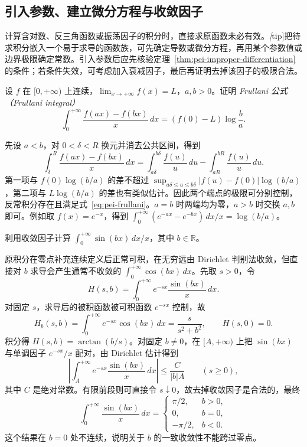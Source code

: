 \subsection{引入参数、建立微分方程与收敛因子}

计算含对数、反三角函数或振荡因子的积分时，直接求原函数未必有效。\emph[tip]{把待求积分嵌入一个易于求导的函数族}，可先确定导数或微分方程，再用某个参数值或边界极限确定常数。引入参数后应先核验定理~\ref{thm:pei-improper-differentiation} 的条件；若条件失效，可考虑加入衰减因子，最后再证明去掉该因子的极限合法。

\begin{example}
\label{ex:pei-frullani}
设 $f$ 在 $[0,+\infty)$ 上连续，$\lim_{x\to+\infty}f(x)=L$，$a,b>0$。证明 \emph{Frullani 公式（Frullani integral）}
\begin{equation}
\label{eq:pei-frullani}
\int_0^{+\infty}\frac{f(ax)-f(bx)}x\,dx
=(f(0)-L)\log\frac ba.
\end{equation}
\end{example}
\begin{solve}
先设 $a<b$，对 $0<\delta<R$ 换元并消去公共区间，得到
\[
\int_\delta^R\frac{f(ax)-f(bx)}x\,dx
=\int_{a\delta}^{b\delta}\frac{f(u)}u\,du
-\int_{aR}^{bR}\frac{f(u)}u\,du.
\]
第一项与 $f(0)\log(b/a)$ 的差不超过
$\sup_{a\delta\le u\le b\delta}|f(u)-f(0)|\log(b/a)$，第二项与 $L\log(b/a)$ 的差也有类似估计。因此两个端点的极限可分别控制，反常积分存在且满足式~\eqref{eq:pei-frullani}。$a=b$ 时两端均为零，$a>b$ 时交换 $a,b$ 即可。例如取 $f(x)=e^{-x}$，得到 $\int_0^{+\infty}(e^{-ax}-e^{-bx})\,dx/x=\log(b/a)$。
\end{solve}

\begin{example}
\label{ex:pei-dirichlet-integral}
利用收敛因子计算 $\int_0^{+\infty}\sin(bx)\,dx/x$，其中 $b\in\mathbb R$。
\end{example}
\begin{solve}
原积分在零点补充连续定义后正常可积，在无穷远由 Dirichlet 判别法收敛，但直接对 $b$ 求导会产生通常不收敛的 $\int_0^{+\infty}\cos(bx)\,dx$。先取 $s>0$，令
\[
H(s,b)=\int_0^{+\infty}e^{-sx}\frac{\sin(bx)}x\,dx.
\]
对固定 $s$，求导后的被积函数被可积函数 $e^{-sx}$ 控制，故
\[
H_b(s,b)=\int_0^{+\infty}e^{-sx}\cos(bx)\,dx
=\frac{s}{s^2+b^2},
\qquad H(s,0)=0.
\]
积分得 $H(s,b)=\arctan(b/s)$。对固定 $b\ne0$，在 $[A,+\infty)$ 上把 $\sin(bx)$ 与单调因子 $e^{-sx}/x$ 配对，由 Dirichlet 估计得到
\[
\left|\int_A^{+\infty}e^{-sx}\frac{\sin(bx)}x\,dx\right|
\le\frac{C}{|b|A}\qquad(s\ge0),
\]
其中 $C$ 是绝对常数。有限前段则可直接令 $s\downarrow0$，故去掉收敛因子是合法的，最终
\begin{equation}
\label{eq:pei-dirichlet-value}
\int_0^{+\infty}\frac{\sin(bx)}x\,dx
=\begin{cases}\pi/2,&b>0,\\0,&b=0,\\-\pi/2,&b<0.\end{cases}
\end{equation}
这个结果在 $b=0$ 处不连续，说明关于 $b$ 的一致收敛性不能跨过零点。
\end{solve}


